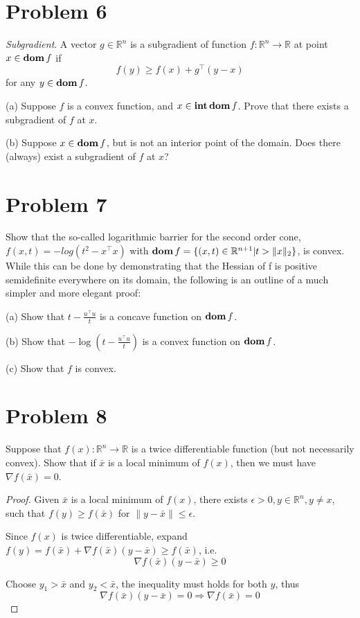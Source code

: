 \documentclass[11pt]{article}
\newcommand{\grad}{\nabla}
\newcommand{\RR}{\mathbb{R}}
\newcommand{\T}{^\top}
\begin{document}
\clearpage
\section*{Problem 6}
\textit{Subgradient}. A vector $g\in \RR^n$ is a subgradient of function $f:\RR^n \rightarrow \RR$ at point $x\in\mathop{\textbf{dom}} f$ if
\[
f(y) \geq f(x) + g\T (y-x)
\] 
for any $y\in\mathop{\textbf{dom}} f$.

(a) Suppose $f$ is a convex function, and $x\in\mathop{\textbf{int}}\mathop{\textbf{dom}} f$. Prove that there exists a subgradient of $f$ at $x$.




(b) Suppose $x\in\mathop{\textbf{dom}} f$, but is not an interior point of the domain. Does there (always) exist a subgradient of $f$ at $x$?


\clearpage
\section*{Problem 7}
Show that the so-called logarithmic barrier for the second order cone, $f(x, t) = -log(t^2 - x\T x)$ with $\dom f = \{(x,t) \in \RR^{n+1} | t>\|x\|_2\}$, is convex.
While this can be done by demonstrating that the Hessian of f is positive semidefinite everywhere on its domain, the following is an outline of a much simpler and more elegant proof:

(a) Show that $t-\frac{u\T u}{t}$ is a concave function on $\mathop{\textbf{dom}} f$.

(b) Show that $-\log (t - \frac{u\T u}{t})$ is a convex function on $\mathop{\textbf{dom}} f$.

(c) Show that $f$ is convex.


\clearpage
\section*{Problem 8}
Suppose that $f(x): \RR^n \rightarrow \RR$ is a twice differentiable function (but not necessarily convex). Show that if $\bar x$ is a local minimum of $f(x)$, then we must have $\grad f(\bar x) = 0$.

\begin{proof}
  Given $\bar x$ is a local minimum of $f(x)$, there exists $\epsilon>0, y\in \RR^n, y\neq x$, such that $f(y) \geq f(\bar x)$ for $\|y - \bar x\| \leq \epsilon$.

  Since $f(x)$ is twice differentiable, expand $f(y) = f(\bar x) + \grad f(\bar x) (y - \bar x) \geq f(\bar x)$, i.e. 
  $$\grad f(\bar x) (y - \bar x) \geq 0$$

  Choose $y_1>\bar x$ and $y_2 < \bar x$, the inequality must holds for both $y$, thus 
  \[
    \grad f(\bar x) (y - \bar x) = 0 \Rightarrow \grad f(\bar x) = 0
  \]
\end{proof}
\end{document}
